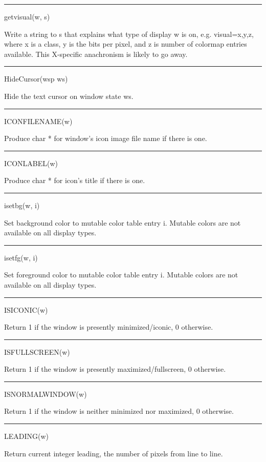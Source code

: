 \bigskip\hrule\vspace{0.1cm}
\noindent
getvisual(w, s)


Write a string to s that explains what type of display w is on,
e.g. {\textquotedbl}visual=x,y,z{\textquotedbl}, where x is a class, y
is the bits per pixel, and z is number of colormap entries
available. This X-specific anachronism is likely to go away.


\bigskip\hrule\vspace{0.1cm}
\noindent
HideCursor(wsp ws)


Hide the text cursor on window state ws.


\bigskip\hrule\vspace{0.1cm}
\noindent
ICONFILENAME(w)


Produce char * for window's icon image file name if there is one.


\bigskip\hrule\vspace{0.1cm}
\noindent
ICONLABEL(w)


Produce char * for icon's title if there is one.


\bigskip\hrule\vspace{0.1cm}
\noindent
isetbg(w, i)


Set background color to mutable color table entry i. Mutable colors
are not available on all display types.


\bigskip\hrule\vspace{0.1cm}
\noindent
isetfg(w, i)


Set foreground color to mutable color table entry i. Mutable colors
are not available on all display types.


\bigskip\hrule\vspace{0.1cm}
\noindent
ISICONIC(w)


Return 1 if the window is presently minimized/iconic, 0 otherwise.


\bigskip\hrule\vspace{0.1cm}
\noindent
ISFULLSCREEN(w)


Return 1 if the window is presently maximized/fullscreen, 0 otherwise.


\bigskip\hrule\vspace{0.1cm}
\noindent
ISNORMALWINDOW(w)


Return 1 if the window is neither minimized nor maximized, 0 otherwise.


\bigskip\hrule\vspace{0.1cm}
\noindent
LEADING(w)


Return current integer leading, the number of pixels from line to line.


